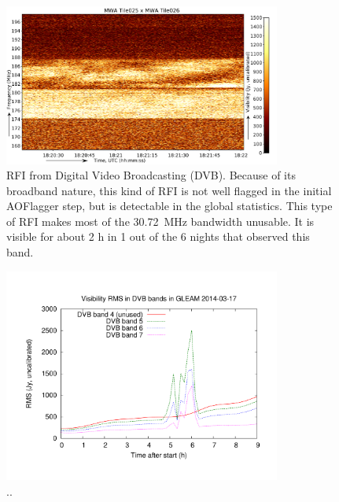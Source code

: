 \documentclass[useAMS,usenatbib]{mn2e}
\begin{document}
\noindent\begin{figure}
\begin{center}\hspace*{-0.2cm}\includegraphics[width=9.1cm]{img/dvb_example}
\caption{RFI from Digital Video Broadcasting (DVB). Because of its broadband nature, this kind of RFI is not well flagged in the initial AOFlagger step, but is detectable in the global statistics. This type of RFI makes most of the 30.72~MHz bandwidth unusable. It is visible for about 2 h in 1 out of the 6 nights that observed this band. }
\label{fig:dvb_example}
\end{center}
\end{figure}



\noindent\begin{figure}
\begin{center}\hspace*{-0.2cm}\includegraphics[width=9.1cm]{img/2014-03-17-dvb-stddevs}
\caption{..}
\label{fig:dvb-stddevs}
\end{center}
\end{figure}
\end{document}
